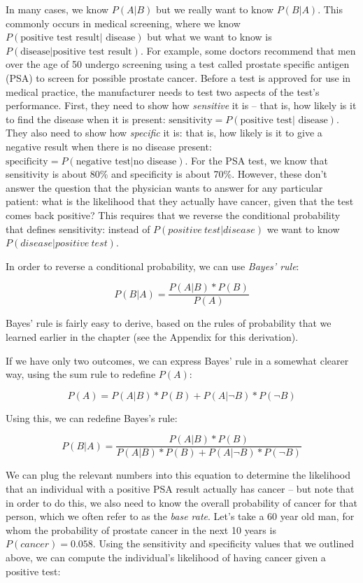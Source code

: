 \documentclass[12pt,]{book}
\theoremstyle{definition}
\theoremstyle{definition}
\theoremstyle{definition}
\theoremstyle{remark}
\begin{document}
In many cases, we know \(P(A|B)\) but we really want to know \(P(B|A)\). This commonly occurs in medical screening, where we know \(P(\text{positive test result| disease})\) but what we want to know is \(P(\text{disease|positive test result})\). For example, some doctors recommend that men over the age of 50 undergo screening using a test called prostate specific antigen (PSA) to screen for possible prostate cancer. Before a test is approved for use in medical practice, the manufacturer needs to test two aspects of the test's performance. First, they need to show how \emph{sensitive} it is -- that is, how likely is it to find the disease when it is present: \(\text{sensitivity} = P(\text{positive test| disease})\). They also need to show how \emph{specific} it is: that is, how likely is it to give a negative result when there is no disease present: \(\text{specificity} = P(\text{negative test|no disease})\). For the PSA test, we know that sensitivity is about 80\% and specificity is about 70\%. However, these don't answer the question that the physician wants to answer for any particular patient: what is the likelihood that they actually have cancer, given that the test comes back positive? This requires that we reverse the conditional probability that defines sensitivity: instead of \(P(positive\ test| disease)\) we want to know \(P(disease|positive\ test)\).

In order to reverse a conditional probability, we can use \emph{Bayes' rule}:

\[
P(B|A) = \frac{P(A|B)*P(B)}{P(A)}
\]

Bayes' rule is fairly easy to derive, based on the rules of probability that we learned earlier in the chapter (see the Appendix for this derivation).

If we have only two outcomes, we can express Bayes' rule in a somewhat clearer way, using the sum rule to redefine \(P(A)\):

\[
P(A) = P(A|B)*P(B) + P(A|\neg B)*P(\neg B)
\]

Using this, we can redefine Bayes's rule:

\[
P(B|A) = \frac{P(A|B)*P(B)}{P(A|B)*P(B) + P(A|\neg B)*P(\neg B)}
\]

We can plug the relevant numbers into this equation to determine the likelihood that an individual with a positive PSA result actually has cancer -- but note that in order to do this, we also need to know the overall probability of cancer for that person, which we often refer to as the \emph{base rate}. Let's take a 60 year old man, for whom the probability of prostate cancer in the next 10 years is \(P(cancer)=0.058\). Using the sensitivity and specificity values that we outlined above, we can compute the individual's likelihood of having cancer given a positive test:
\end{document}
